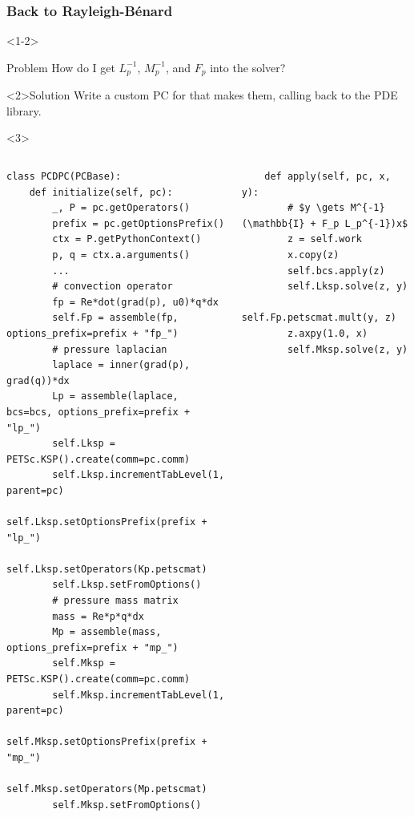 \documentclass[presentation,aspectratio=43]{beamer}
\begin{document}
\begin{frame}[fragile,t]
  \frametitle{Back to Rayleigh-B\'enard}
  \begin{onlyenv}<1-2>
    \begin{alertblock}{Problem}
      How do I get $L_p^{-1}$, $M_p^{-1}$, and $F_p$ into the solver?
    \end{alertblock}
    \begin{alertblock}<2>{Solution}
      Write a custom PC for that makes them, calling back to the PDE library.
    \end{alertblock}
  \end{onlyenv}
  \begin{onlyenv}<3>
    \begin{columns}[T]
      \begin{column}{0.49\textwidth}
\begin{verbatim}
class PCDPC(PCBase):
    def initialize(self, pc):
        _, P = pc.getOperators()
        prefix = pc.getOptionsPrefix()
        ctx = P.getPythonContext()
        p, q = ctx.a.arguments()
        ...
        # convection operator
        fp = Re*dot(grad(p), u0)*q*dx
        self.Fp = assemble(fp, options_prefix=prefix + "fp_")
        # pressure laplacian
        laplace = inner(grad(p), grad(q))*dx
        Lp = assemble(laplace, bcs=bcs, options_prefix=prefix + "lp_")
        self.Lksp = PETSc.KSP().create(comm=pc.comm)
        self.Lksp.incrementTabLevel(1, parent=pc)
        self.Lksp.setOptionsPrefix(prefix + "lp_")
        self.Lksp.setOperators(Kp.petscmat)
        self.Lksp.setFromOptions()
        # pressure mass matrix
        mass = Re*p*q*dx
        Mp = assemble(mass, options_prefix=prefix + "mp_")
        self.Mksp = PETSc.KSP().create(comm=pc.comm)
        self.Mksp.incrementTabLevel(1, parent=pc)
        self.Mksp.setOptionsPrefix(prefix + "mp_")
        self.Mksp.setOperators(Mp.petscmat)
        self.Mksp.setFromOptions()
\end{verbatim}
      \end{column}
      \begin{column}{0.49\textwidth}
\begin{verbatim}
    def apply(self, pc, x, y):
        # $y \gets M^{-1}(\mathbb{I} + F_p L_p^{-1})x$
        z = self.work
        x.copy(z)
        self.bcs.apply(z)
        self.Lksp.solve(z, y)
        self.Fp.petscmat.mult(y, z)
        z.axpy(1.0, x)
        self.Mksp.solve(z, y)
\end{verbatim}
      \end{column}
    \end{columns}
  \end{onlyenv}
\end{frame}
\end{document}
